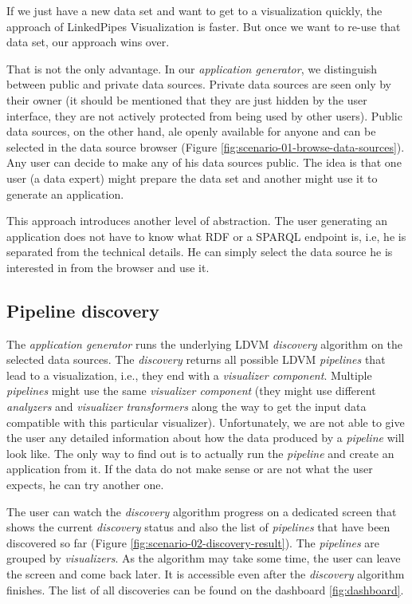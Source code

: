 If we just have a new data set and want to get to a visualization quickly, the approach of LinkedPipes Visualization is faster. But once we want to re-use that data set, our approach wins over. 

That is not the only advantage. In our \emph{application generator}, we distinguish between public and private data sources. Private data sources are seen only by their owner (it should be mentioned that they are just hidden by the user interface, they are not actively protected from being used by other users). Public data sources, on the other hand, ale openly available for anyone and can be selected in the data source browser (Figure \ref{fig:scenario-01-browse-data-sources}). Any user can decide to make any of his data sources public. The idea is that one user (a data expert) might prepare the data set and another might use it to generate an application.

This approach introduces another level of abstraction. The user generating an application does not have to know what RDF or a SPARQL endpoint is, i.e, he is separated from the technical details. He can simply select the data source he is interested in from the browser and use it.

\subsection{Pipeline discovery}

The \emph{application generator} runs the underlying LDVM \emph{discovery} algorithm on the selected data sources. The \emph{discovery} returns all possible LDVM \emph{pipelines} that lead to a visualization, i.e., they end with a \emph{visualizer component}. Multiple \emph{pipelines} might use the same \emph{visualizer component} (they might use different \emph{analyzers} and \emph{visualizer transformers} along the way to get the input data compatible with this particular visualizer). Unfortunately, we are not able to give the user any detailed information about how the data produced by a \emph{pipeline} will look like. The only way to find out is to actually run the \emph{pipeline} and create an application from it. If the data do not make sense or are not what the user expects, he can try another one.

The user can watch the \emph{discovery} algorithm progress on a dedicated screen that shows the current \emph{discovery} status and also the list of \emph{pipelines} that have been discovered so far (Figure \ref{fig:scenario-02-discovery-result}). The \emph{pipelines} are grouped by \emph{visualizers}. As the algorithm may take some time, the user can leave the screen and come back later. It is accessible even after the \emph{discovery} algorithm finishes. The list of all discoveries can be found on the dashboard \ref{fig:dashboard}.

